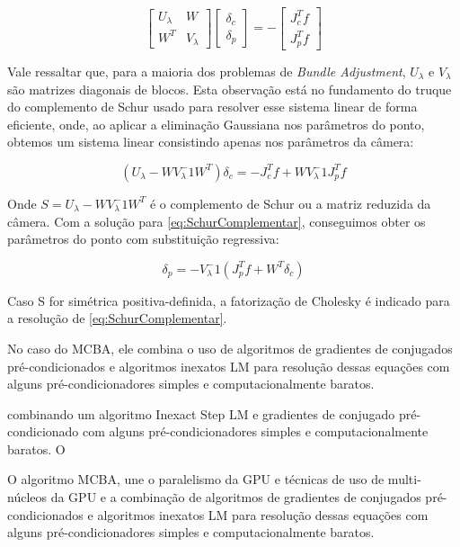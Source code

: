 \begin{itemize}
\[
\begin{bmatrix}
U_\lambda & W \\
W^T & V_\lambda 
\end{bmatrix}
\begin{bmatrix}
\delta_c\\ 
\delta_p
\end{bmatrix} =
-\begin{bmatrix}
J_c^T f\\ 
J_p^T f
\end{bmatrix}
\]

Vale ressaltar que, para a maioria dos problemas de \emph{Bundle Adjustment}, $U_\lambda$ e $V_\lambda$ são matrizes diagonais de blocos. Esta observação está no fundamento do truque do complemento de Schur usado para resolver esse sistema linear de forma eficiente, onde, ao aplicar a eliminação Gaussiana nos parâmetros do ponto, obtemos um sistema linear consistindo apenas nos parâmetros da câmera:

\begin{equation}
\label{eq:SchurComplementar}
(U_\lambda - W V_\lambda^-1 W^T)\delta_c = -J_c^T f + WV_\lambda^-1 J_p^T f
\end{equation}

Onde $S = U_\lambda - W V_\lambda^-1 W^T$ é o complemento de Schur ou a matriz reduzida da câmera. Com a solução para \ref{eq:SchurComplementar}, conseguimos obter os parâmetros do ponto com substituição regressiva:

\begin{equation}
\delta_p = -V_\lambda^-1(J_p^T f + W^T \delta_c)
\end{equation}

Caso S for simétrica positiva-definida, a fatorização de Cholesky é indicado para a resolução de \ref{eq:SchurComplementar}. 

No caso do MCBA, ele combina o uso de algoritmos de gradientes de conjugados pré-condicionados e algoritmos inexatos LM para resolução dessas equações  com alguns pré-condicionadores simples e computacionalmente baratos. 

combinando um algoritmo Inexact Step LM e gradientes de conjugado pré-condicionado com alguns pré-condicionadores simples e computacionalmente baratos. O

O algoritmo MCBA, une o paralelismo da GPU e técnicas de uso de multi-núcleos da GPU e a combinação  de algoritmos de gradientes de conjugados pré-condicionados e algoritmos inexatos LM para resolução dessas equações  com alguns pré-condicionadores simples e computacionalmente baratos. 



\end{itemize}
